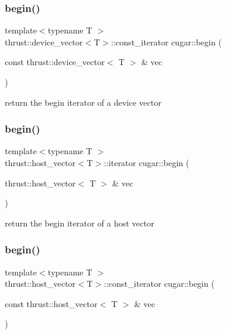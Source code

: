 \subsubsection{\texorpdfstring{begin()}{begin()}\hspace{0.1cm}{\footnotesize\ttfamily [2/4]}}
{\footnotesize\ttfamily template$<$typename T $>$ \\
thrust\+::device\+\_\+vector$<$T$>$\+::const\+\_\+iterator cugar\+::begin (\begin{DoxyParamCaption}\item[{const thrust\+::device\+\_\+vector$<$ T $>$ \&}]{vec }\end{DoxyParamCaption})}

return the begin iterator of a device vector \mbox{\label{namespacecugar_a8a6b151a6640c04a23f3cacd28439630}} 
\subsubsection{\texorpdfstring{begin()}{begin()}\hspace{0.1cm}{\footnotesize\ttfamily [3/4]}}
{\footnotesize\ttfamily template$<$typename T $>$ \\
thrust\+::host\+\_\+vector$<$T$>$\+::iterator cugar\+::begin (\begin{DoxyParamCaption}\item[{thrust\+::host\+\_\+vector$<$ T $>$ \&}]{vec }\end{DoxyParamCaption})}

return the begin iterator of a host vector \mbox{\label{namespacecugar_a78dcc4dcd287c31dd89c0e0f0fb22ebe}} 
\subsubsection{\texorpdfstring{begin()}{begin()}\hspace{0.1cm}{\footnotesize\ttfamily [4/4]}}
{\footnotesize\ttfamily template$<$typename T $>$ \\
thrust\+::host\+\_\+vector$<$T$>$\+::const\+\_\+iterator cugar\+::begin (\begin{DoxyParamCaption}\item[{const thrust\+::host\+\_\+vector$<$ T $>$ \&}]{vec }\end{DoxyParamCaption})}

